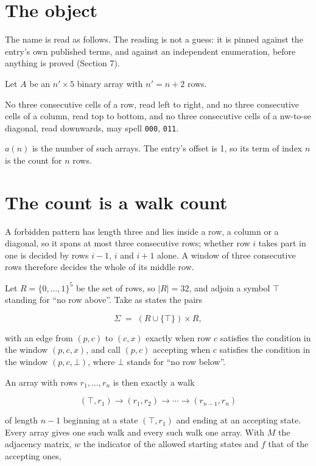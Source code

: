 \documentclass[11pt]{article}
\theoremstyle{definition}
\begin{document}
\section{The object}

The name is read as follows. The reading is not a guess: it is pinned against the entry's own published terms, and against an independent enumeration, before anything is proved (Section 7).

Let $A$ be an $n' \times 5$ binary array with $n' = n + 2$ rows.

No three consecutive cells of a row, read left to right, and no three consecutive cells of a column, read top to bottom, and no three consecutive cells of a nw-to-se diagonal, read downwards, may spell \texttt{000}, \texttt{011}.

$a(n)$ is the number of such arrays. The entry's offset is 1, so its term of index $n$ is the count for $n$ rows.

\section{The count is a walk count}

A forbidden pattern has length three and lies inside a row, a column or a diagonal, so it spans at most three consecutive rows; whether row $i$ takes part in one is decided by rows $i-1$, $i$ and $i+1$ alone. A window of three consecutive rows therefore decides the whole of its middle row.

Let $R = \{0,\dots,1\}^{5}$ be the set of rows, so $|R| = 32$, and adjoin a symbol $\top$ standing for ``no row above''. Take as states the pairs

\[\Sigma \;=\; (R \cup \{\top\}) \times R,\]

with an edge from $(p,c)$ to $(c,x)$ exactly when row $c$ satisfies the condition in the window $(p,c,x)$, and call $(p,c)$ accepting when $c$ satisfies the condition in the window $(p,c,\bot)$, where $\bot$ stands for ``no row below''.

An array with rows $r_1,\dots,r_n$ is then exactly a walk

\[(\top,r_1) \to (r_1,r_2) \to \cdots \to (r_{n-1},r_n)\]

of length $n-1$ beginning at a state $(\top,r_1)$ and ending at an accepting state. Every array gives one such walk and every such walk one array. With $M$ the adjacency matrix, $w$ the indicator of the allowed starting states and $f$ that of the accepting ones,
\end{document}

